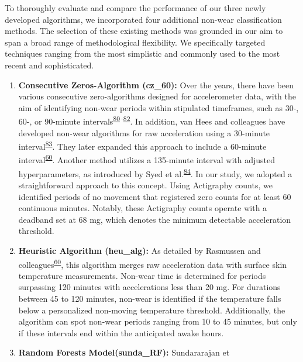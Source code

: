 \documentclass[
  9pt,
]{scrbook}
\begin{document}
To thoroughly evaluate and compare the performance of our three newly
developed algorithms, we incorporated four additional non-wear
classification methods. The selection of these existing methods was
grounded in our aim to span a broad range of methodological flexibility.
We specifically targeted techniques ranging from the most simplistic and
commonly used to the most recent and sophisticated.

\begin{enumerate}
\def\labelenumi{\arabic{enumi}.}
\item
  \textsf{\textbf{Consecutive Zeros-Algorithm (cz\_60):}} Over the
  years, there have been various consecutive zero-algorithms designed
  for accelerometer data, with the aim of identifying non-wear periods
  within stipulated timeframes, such as 30-, 60-, or 90-minute
  intervals\textsuperscript{\protect\hyperlink{ref-hecht_methodology_2009}{80}--\protect\hyperlink{ref-choi_validation_2011}{82}}.
  In addition, van Hees and colleagues have developed non-wear
  algorithms for raw acceleration using a 30-minute
  interval\textsuperscript{\protect\hyperlink{ref-van_hees_estimation_2011}{83}}.
  They later expanded this approach to include a 60-minute
  interval\textsuperscript{\protect\hyperlink{ref-rasmussen_short-term_2020}{60}}.
  Another method utilizes a 135-minute interval with adjusted
  hyperparameters, as introduced by Syed et
  al.\textsuperscript{\protect\hyperlink{ref-syed_evaluating_2020}{84}}.
  In our study, we adopted a straightforward approach to this concept.
  Using Actigraphy counts, we identified periods of no movement that
  registered zero counts for at least 60 continuous minutes. Notably,
  these Actigraphy counts operate with a deadband set at 68 mg, which
  denotes the minimum detectable acceleration threshold.
\item
  \textsf{\textbf{Heuristic Algorithm (heu\_alg):}} As detailed by
  Rasmussen and
  colleagues\textsuperscript{\protect\hyperlink{ref-rasmussen_short-term_2020}{60}},
  this algorithm merges raw acceleration data with surface skin
  temperature measurements. Non-wear time is determined for periods
  surpassing 120 minutes with accelerations less than 20 mg. For
  durations between 45 to 120 minutes, non-wear is identified if the
  temperature falls below a personalized non-moving temperature
  threshold. Additionally, the algorithm can spot non-wear periods
  ranging from 10 to 45 minutes, but only if these intervals end within
  the anticipated awake hours.
\item
  \textsf{\textbf{Random Forests Model(sunda\_RF):}} Sundararajan et

\end{enumerate}
\end{document}
